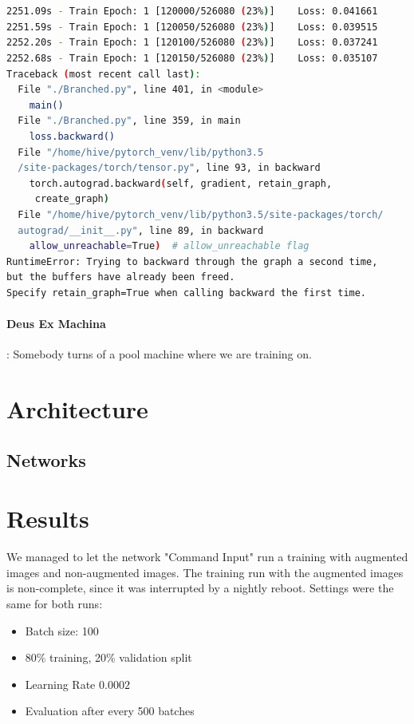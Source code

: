 \documentclass[a4paper]{article}
\begin{document}
\begin{lstlisting}[language=bash, caption={Nigthly Reboot Interruption}]


2251.09s - Train Epoch: 1 [120000/526080 (23%)]    Loss: 0.041661
2251.59s - Train Epoch: 1 [120050/526080 (23%)]    Loss: 0.039515
2252.20s - Train Epoch: 1 [120100/526080 (23%)]    Loss: 0.037241
2252.68s - Train Epoch: 1 [120150/526080 (23%)]    Loss: 0.035107
Traceback (most recent call last):
  File "./Branched.py", line 401, in <module>
    main()
  File "./Branched.py", line 359, in main
    loss.backward()
  File "/home/hive/pytorch_venv/lib/python3.5
  /site-packages/torch/tensor.py", line 93, in backward
    torch.autograd.backward(self, gradient, retain_graph,
     create_graph)
  File "/home/hive/pytorch_venv/lib/python3.5/site-packages/torch/
  autograd/__init__.py", line 89, in backward
    allow_unreachable=True)  # allow_unreachable flag
RuntimeError: Trying to backward through the graph a second time, 
but the buffers have already been freed. 
Specify retain_graph=True when calling backward the first time.

\end{lstlisting}

\paragraph{Deus Ex Machina}: Somebody turns of a pool machine where we are training on.

\section{Architecture}
\subsection{Networks}

\section{Results}
We managed to let the network "Command Input" run a training with augmented images and non-augmented images.
The training run with the augmented images is non-complete, since it was interrupted by a nightly reboot.
Settings were the same for both runs:
\begin{itemize}
	\item Batch size: 100
	\item 80\% training, 20\% validation split
	\item Learning Rate $0.0002$
	\item Evaluation after every 500 batches
\end{itemize}
\end{document}
